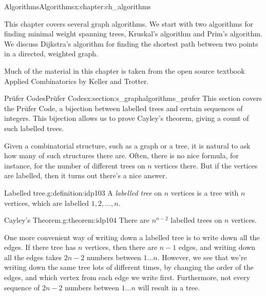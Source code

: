 \documentclass[oneside,10pt,]{book}
\numberwithin{equation}{section}
\begin{document}
%
%
\typeout{************************************************}
\typeout{************************************************}
%
\begin{chapterptx}{Algorithms}{}{Algorithms}{}{}{x:chapter:ch_algorithms}
\begin{introduction}{}%
This chapter covers several graph algorithms.  We start with two algorithms for finding minimal weight spanning trees, Kruskal's algorithm and Prim's algorithm.  We discuss Dijkstra's algorithm for finding the shortest path between two points in a directed, weighted graph.%
\par
Much of the material in this chapter is taken from the open source textbook Applied Combinatorics by Keller and Trotter.%
\end{introduction}%
%
%
\typeout{************************************************}
\typeout{************************************************}
%
\begin{sectionptx}{Prüfer Codes}{}{Prüfer Codes}{}{}{x:section:s_graphalgorithms_prufer}
This section covers the Prüfer Code, a bijection between labelled trees and certain sequences of integers. This bijection allows us to prove Cayley's theorem, giving a count of such labelled trees.%
\par
Given a combinatorial structure, such as a graph or a tree, it is natural to ask how many of such structures there are.  Often, there is no nice formula, for instance, for the number of different trees on \(n\) vertices there.  But if the vertices are labelled, then it turns out there's a nice answer.%
\begin{definition}{Labelled tree.}{g:definition:idp103}%
A \emph{labelled tree} on \(n\) vertices is a tree with \(n\) vertices, which are labelled \(1,2,\dots,n.\)%
\end{definition}
\begin{theorem}{Cayley's Theorem.}{}{g:theorem:idp104}%
There are \(n^{n-2}\) labelled trees on \(n\) vertices.%
\end{theorem}
One more convenient way of writing down a labelled tree is to write down all the edges.  If there tree has \(n\) vertices, then there are \(n-1\) edges, and writing down all the edges takes \(2n-2\) numbers between \(1...n\).  However, we see that we're writing down the same tree lots of different times, by changing the order of the edges, and which vertex from each edge we write first.  Furthermore, not every sequence of \(2n-2\) numbers between \(1...n\) will result in a tree.%

\end{sectionptx}
\end{chapterptx}
\end{document}

